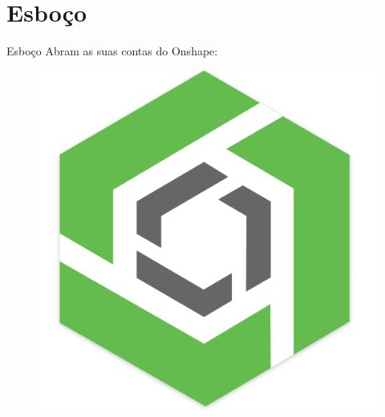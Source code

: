 \documentclass{cubeamer}
\begin{document}
\section*{Esboço}
\begin{frame}{Esboço}
    Abram as suas contas do Onshape:
    \newline
    \begin{center}
        \begin{figure}
            \centering
            \includegraphics[height = 0.4\textheight]{img/onshape.png}
            \caption{\cite{Onshape:online}}
        \end{figure}
    \end{center}
\end{frame}
\end{document}
